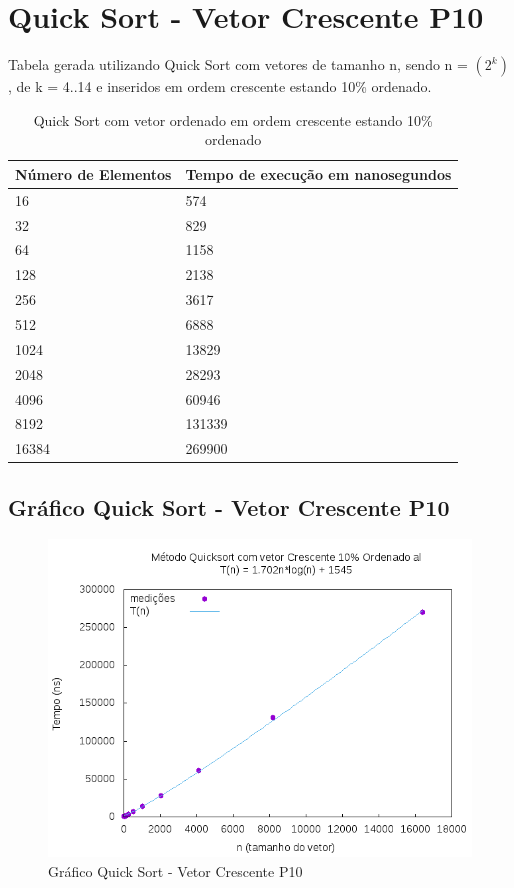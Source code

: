 \documentclass[12pt,a4paper,twoside]{report}
\begin{document}
\section{Quick Sort - Vetor Crescente P10}
Tabela gerada utilizando Quick Sort com vetores de tamanho n, sendo n = $(2^k)$, de k = 4..14 e inseridos em ordem crescente estando 10\% ordenado.
\begin{table}[H]
\centering
\caption{Quick Sort com vetor ordenado em ordem crescente estando 10\% ordenado}
\label{my-label}
\begin{tabular}{|l|l|}
\hline
\multicolumn{1}{|c|}{\textbf{Número de Elementos}} & \multicolumn{1}{c|}{\textbf{Tempo de execução em nanosegundos}} \\ \hline
16 & 574 \\ \hline
32 & 829 \\ \hline
64 & 1158 \\ \hline
128 & 2138 \\ \hline
256 & 3617 \\ \hline
512 & 6888 \\ \hline
1024 & 13829 \\ \hline
2048 & 28293 \\ \hline
4096 & 60946 \\ \hline
8192 & 131339 \\ \hline
16384 & 269900 \\ \hline
\end{tabular}
\end{table}

\subsection{Gráfico Quick Sort - Vetor Crescente P10}
\begin{figure}[H]
    \centering
    \includegraphics[width=0.7\linewidth]{graficos/QuickSort/vIntCrescenteP10/vIntCrescenteP10.png}
  \caption{Gráfico Quick Sort - Vetor Crescente P10}
\end{figure}
\end{document}
